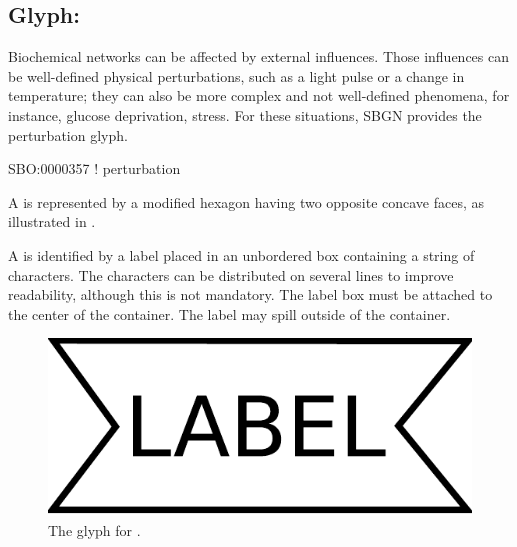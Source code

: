 \subsection{Glyph: }
\label{sec:af:perturbation}

Biochemical networks can be affected by external influences. Those influences can be well-defined physical perturbations, such as a light pulse or a change in temperature; they can also be more complex and not well-defined phenomena, for instance, glucose deprivation, stress. For these situations, SBGN provides the perturbation glyph. 

\begin{glyphDescription}

\glyphSboTerm SBO:0000357 ! perturbation

\glyphContainer A  is represented by a modified hexagon
having two opposite concave faces, as illustrated in .

\glyphLabel A  is identified by a label placed in an unbordered box containing a string of characters.  The characters can be distributed on several lines to improve readability, although this is not mandatory.  The label box must be attached to the center of the  container.  The label may spill outside of the container.

\end{glyphDescription}

\begin{figure}[H]
  \centering
  \includegraphics[scale=0.3]{images/perturbation}
  \caption{The \AF glyph for .}
  \label{fig:af:perturbation}
\end{figure}
